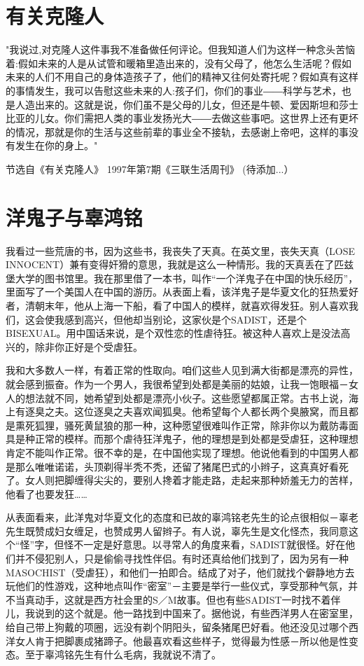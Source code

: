 \chapter{有关克隆人}

  "我说过,对克隆人这件事我不准备做任何评论。但我知道人们为这样一种念头苦恼着:假如未来的人是从试管和暖箱里造出来的，没有父母了，他怎么生活呢？假如未来的人们不用自己的身体造孩子了，他们的精神又往何处寄托呢？假如真有这样的事情发生，我可以告慰这些未来的人:孩子们，你们的事业――科学与艺术，也是人造出来的。这就是说，你们虽不是父母的儿女，但还是牛顿、爱因斯坦和莎士比亚的儿女。你们需把人类的事业发扬光大――去做这些事吧。这世界上还有更坏的情况，那就是你的生活与这些前辈的事业全不接轨，去感谢上帝吧，这样的事没有发生在你的身上。" 

节选自《有关克隆人》 1997年第7期《三联生活周刊》 
(待添加...）

\chapter{洋鬼子与辜鸿铭}

我看过一些荒唐的书，因为这些书，我丧失了天真。在英文里，丧失天真（LOSE INNOCENT）兼有变得奸猾的意思，我就是这么一种情形。我的天真丢在了匹兹堡大学的图书馆里。我在那里借了一本书，叫作“一个洋鬼子在中国的快乐经历”，里面写了一个美国人在中国的游历。从表面上看，该洋鬼子是华夏文化的狂热爱好者，清朝末年，他从上海一下船，看了中国人的模样，就喜欢得发狂。别人喜欢我们，这会使我感到高兴，但他却当别论，这家伙是个SADIST，还是个BISEXUAL。用中国话来说，是个双性恋的性虐待狂。被这种人喜欢上是没法高兴的，除非你正好是个受虐狂。 

我和大多数人一样，有着正常的性取向。咱们这些人见到满大街都是漂亮的异性，就会感到振奋。作为一个男人，我很希望到处都是美丽的姑娘，让我一饱眼福－女人的想法就不同，她希望到处都是漂亮小伙子。这些愿望都属正常。古书上说，海上有逐臭之夫。这位逐臭之夫喜欢闻狐臭。他希望每个人都长两个臭腋窝，而且都是熏死狐狸，骚死黄鼠狼的那一种，这种愿望很难叫作正常，除非你以为戴防毒面具是种正常的模样。而那个虐待狂洋鬼子，他的理想是到处都是受虐狂，这种理想肯定不能叫作正常。很不幸的是，在中国他实现了理想。他说他看到的中国男人都是那么唯唯诺诺，头顶剃得半秃不秃，还留了猪尾巴式的小辫子，这真真好看死了。女人则把脚缠得尖尖的，要别人搀着才能走路，走起来那种娇羞无力的苦样，他看了也要发狂…… 

从表面看来，此洋鬼对华夏文化的态度和已故的辜鸿铭老先生的论点很相似－辜老先生既赞成妇女缠足，也赞成男人留辫子。有人说，辜先生是文化怪杰，我同意这个“怪”字，但怪不一定是好意思。以寻常人的角度来看，SADIST就很怪。好在他们并不侵犯别人，只是偷偷寻找性伴侣。有时还真给他们找到了，因为另有一种MASOCHIST（受虐狂），和他们一拍即合。结成了对子，他们就找个僻静地方去玩他们的性游戏，这种地点叫作“密室”－主要是举行一些仪式，享受那种气氛，并不当真动手，这就是西方社会里的S／M故事。但也有些SADIST一时找不着伴儿，我说到的这个就是。他一路找到中国来了。据他说，有些西洋男人在密室里，给自己带上狗戴的项圈，远没有剃个阴阳头，留条猪尾巴好看。他还没见过哪个西洋女人肯于把脚裹成猪蹄子。他最喜欢看这些样子，觉得最为性感－所以他是性变态。至于辜鸿铭先生有什么毛病，我就说不清了。 

